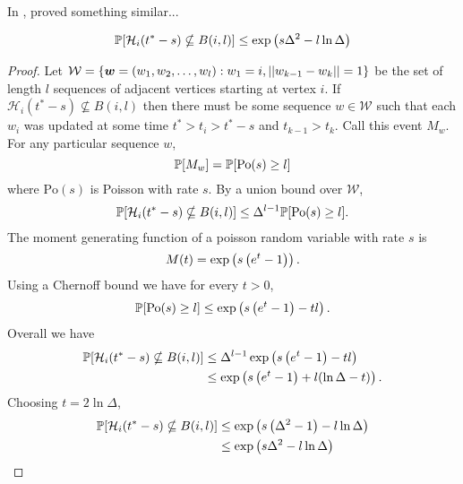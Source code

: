 In \cite{Lubetzky2016-wd}, \citeauthor{Lubetzky2016-wd} proved something similar...
\begin{lemma}
	\begin{equation}
		\mathbb{P}[\mathcal{H}_i(t^* - s) \nsubseteq B(i, l)] \leq \exp\left(s \Delta^2 - l \ln \Delta \right)
	\end{equation}
\end{lemma}
\begin{proof}
	Let $\mathcal{W} = \{{\bm{{w}}} = (w_1, w_2, \dots, w_l) : w_1 = i, ||w_{k-1} - w_k|| = 1\}$ be the set of length $l$ sequences of adjacent vertices starting at vertex $i$. If $\mathcal{H}_i(t^* - s) \nsubseteq B(i, l)$ then there must be some sequence $w \in \mathcal{W}$ such that each $w_i$ was updated at some time $t^* > t_i > t^* - s$ and $t_{k-1} > t_k$. Call this event $M_w$. For any particular sequence $w$,
	\begin{equation}
		\mathbb{P}[M_w] = \mathbb{P}[\mathrm{Po}(s) \geq l]
	\end{equation}
	where $\mathrm{Po}(s)$ is Poisson with rate $s$. By a union bound over $\mathcal{W}$,
	\begin{equation}
		\mathbb{P}[\mathcal{H}_i(t^* - s) \nsubseteq B(i, l)] \leq \Delta^{l-1} \mathbb{P}[\mathrm{Po}(s) \geq l].
	\end{equation}
	The moment generating function of a poisson random variable with rate $s$ is
	\begin{equation}
		M(t) = \exp\left(s\left(e^t - 1\right)\right).
	\end{equation}
	Using a Chernoff bound we have for every $t > 0$,
	\begin{equation}
		\mathbb{P}[\mathrm{Po}(s) \geq l] \leq \exp\left(s\left(e^t - 1\right) - t l\right).
	\end{equation}
	Overall we have
	\begin{align}
		\mathbb{P}[\mathcal{H}_i(t^* - s) \nsubseteq B(i, l)] &\leq \Delta^{l-1} \exp\left(s\left(e^t - 1\right) - t l\right)\\
		&\leq \exp\left(s\left(e^t - 1\right) + l (\ln \Delta - t) \right).
	\end{align}
	Choosing $t = 2 \ln \Delta$,
	\begin{align}
		\mathbb{P}[\mathcal{H}_i(t^* - s) \nsubseteq B(i, l)] &\leq \exp\left(s\left(\Delta^2 - 1\right) - l \ln \Delta \right)\\
		&\leq \exp\left(s \Delta^2 - l \ln \Delta \right)\\
	\end{align}
\end{proof}

